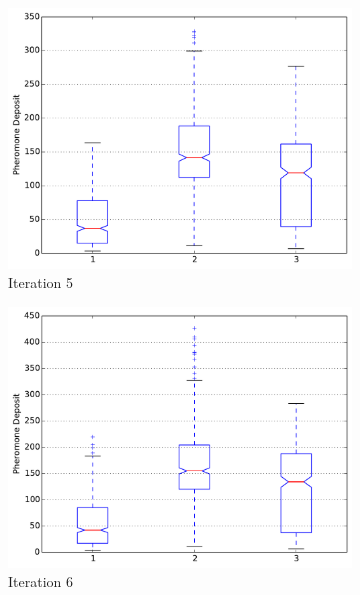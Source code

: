 \documentclass{llncs}
\begin{document}
\begin{figure}[H]
        \begin{subfigure}[b]{0.3\textwidth}
                \includegraphics[width=\textwidth]{PLT/Comparision/BOXPLOT/Iteration5}
                \caption{Iteration 5}
                \label{fig:plt_iter5}
        \end{subfigure}%
        \quad
        \begin{subfigure}[b]{0.3\textwidth}
                \includegraphics[width=\textwidth]{PLT/Comparision/BOXPLOT/Iteration6}
                \caption{Iteration 6}
                \label{fig:plt_iter6}
        \end{subfigure}
        \quad
        \begin{subfigure}[b]{0.3\textwidth}

\end{subfigure}
\end{figure}
\end{document}
